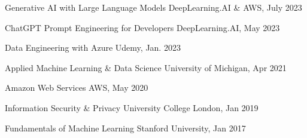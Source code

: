 
\begin{cventries}

  	\vspace{-0.2cm}
    \cventry
    {}
    {Generative AI with Large Language Models}
    {DeepLearning.AI \& AWS, July 2023} %
    {} %
    {}
    
    \vspace{-0.9cm}
    \cventry
    {}
    {ChatGPT Prompt Engineering for Developers}
    {DeepLearning.AI, May 2023}
    {}
    {}
    
    \vspace{-0.9cm}
    \cventry
    {}
    {Data Engineering with Azure}
    {Udemy, Jan. 2023}
    {}
    {}
    
    \vspace{-0.9cm}
    \cventry
    {}
    {Applied Machine Learning \& Data Science}
    {University of Michigan, Apr 2021}
    {}
    {}
    
    \vspace{-0.9cm}
    \cventry
    {}
    {Amazon Web Services}
    {AWS, May 2020}
    {}
    {}
    
    \vspace{-0.9cm}
    \cventry
    {}
    {Information Security \& Privacy}
    {University College London, Jan 2019}
    {}
    {}
    
    \vspace{-0.9cm}
    \cventry
    {}
    {Fundamentals of Machine Learning}
    {Stanford University, Jan 2017}
    {}
    {}
	
	\vspace{-1.25cm}
\end{cventries}
